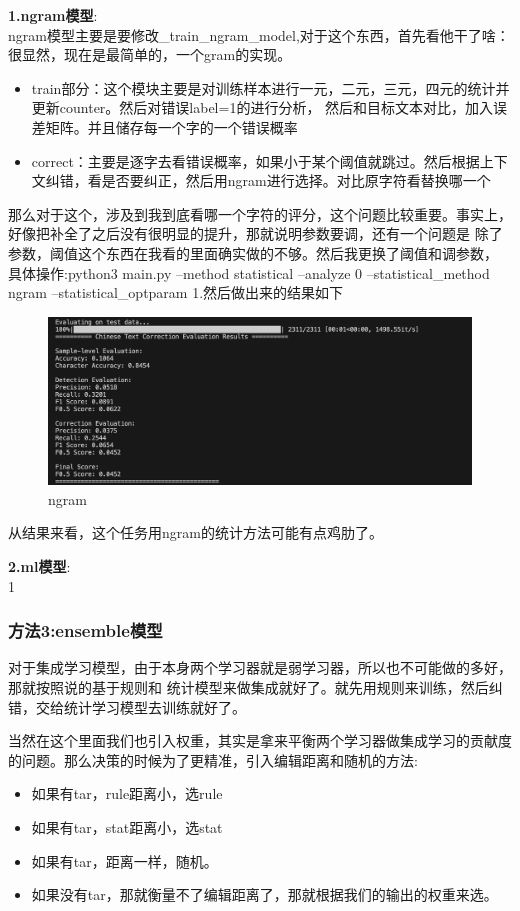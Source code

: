 \documentclass[answers]{exam}  %
\begin{document}
\textbf{1.ngram模型}:\\
ngram模型主要是要修改\_train\_ngram\_model,对于这个东西，首先看他干了啥：很显然，现在是最简单的，一个gram的实现。
\begin{itemize}
    \item train部分：这个模块主要是对训练样本进行一元，二元，三元，四元的统计并更新counter。然后对错误label=1的进行分析，
    然后和目标文本对比，加入误差矩阵。并且储存每一个字的一个错误概率
    \item correct：主要是逐字去看错误概率，如果小于某个阈值就跳过。然后根据上下文纠错，看是否要纠正，然后用ngram进行选择。对比原字符看替换哪一个
\end{itemize}
那么对于这个，涉及到我到底看哪一个字符的评分，这个问题比较重要。事实上，好像把补全了之后没有很明显的提升，那就说明参数要调，还有一个问题是
除了参数，阈值这个东西在我看的里面确实做的不够。然后我更换了阈值和调参数，
具体操作:python3 main.py --method statistical --analyze 0 --statistical\_method ngram --statistical\_optparam 1.然后做出来的结果如下 \\
\begin{figure}[H]
    \centering
    \label{ngram}
    \includegraphics[width=.6\textwidth]{../pic/ngram.png} 
    \caption{ngram}  
\end{figure}

从结果来看，这个任务用ngram的统计方法可能有点鸡肋了。

\medskip

\textbf{2.ml模型}:\\
1

\subsubsection{方法3:ensemble模型}

对于集成学习模型，由于本身两个学习器就是弱学习器，所以也不可能做的多好，那就按照说的基于规则和
统计模型来做集成就好了。就先用规则来训练，然后纠错，交给统计学习模型去训练就好了。

当然在这个里面我们也引入权重，其实是拿来平衡两个学习器做集成学习的贡献度的问题。那么决策的时候为了更精准，引入编辑距离和随机的方法:
\begin{itemize}
    \item 如果有tar，rule距离小，选rule
    \item 如果有tar，stat距离小，选stat
    \item 如果有tar，距离一样，随机。
    \item 如果没有tar，那就衡量不了编辑距离了，那就根据我们的输出的权重来选。
\end{itemize}
\end{document}
